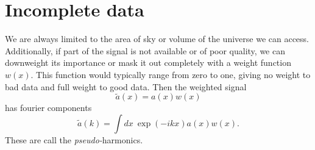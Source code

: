 \section{Incomplete data}

We are always limited to the area of sky or volume of the universe we can access.  Additionally, if part of the signal is not available or of poor quality, we can downweight its importance or mask it out completely with a weight function $w(x)$.  This function would typically range from zero to one, giving no weight to bad data and full weight to good data.  Then the weighted signal
\begin{equation}\tilde a(x) = a(x) w(x)\end{equation}
has fourier components
\begin{equation}
  \tilde a(k) = \int dx\  \exp(-i k x) a(x) w(x).
\end{equation}
These are call the \textit{pseudo-}harmonics.

